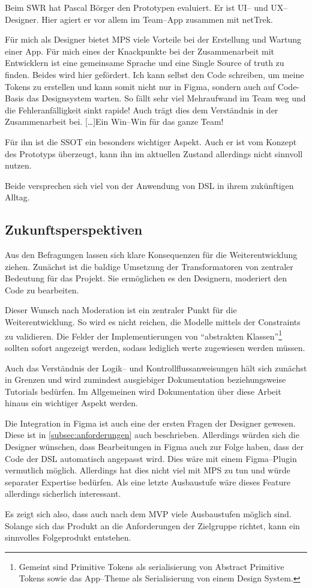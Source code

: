 Beim \ac{SWR} hat Pascal Börger den Prototypen evaluiert.
Er ist \acs{UI}-- und \acs{UX}--Designer.
Hier agiert er vor allem im Team--App zusammen mit \ac{netTrek}.
\begin{displayquote}
    Für mich als Designer bietet MPS viele Vorteile bei der Erstellung und Wartung einer App.
    Für mich eines der Knackpunkte bei der Zusammenarbeit mit Entwicklern ist eine gemeinsame Sprache und eine Single Source of truth zu finden.
    Beides wird hier gefördert.
    Ich kann selbst den Code schreiben, um meine Tokens zu erstellen und kann somit nicht nur in Figma, sondern auch auf Code-Basis das Designsystem warten.
    So fällt sehr viel Mehraufwand im Team weg und die Fehleranfälligkeit sinkt rapide!
    Auch trägt dies dem Verständnis in der Zusammenarbeit bei.
    [\ldots]\@ Ein Win--Win für das ganze Team!
\end{displayquote}
Für ihn ist die \ac{SSOT} ein besonders wichtiger Aspekt.
Auch er ist vom Konzept des Prototyps überzeugt, kann ihn im aktuellen Zustand allerdings nicht sinnvoll nutzen.

Beide versprechen sich viel von der Anwendung von \ac{DSL} in ihrem zukünftigen Alltag.

\subsection{Zukunftsperspektiven}\label{subsec:zukunftsperspektive}
Aus den Befragungen lassen sich klare Konsequenzen für die Weiterentwicklung ziehen.
Zunächst ist die baldige Umsetzung der Transformatoren von zentraler Bedeutung für das Projekt.
Sie ermöglichen es den Designern, moderiert den Code zu bearbeiten.

Dieser Wunsch nach Moderation ist ein zentraler Punkt für die Weiterentwicklung.
So wird es nicht reichen, die Modelle mittels der Constraints zu validieren.
Die Felder der Implementierungen von \enquote{abstrakten Klassen}\footnote{Gemeint sind Primitive Tokens als serialisierung von Abstract Primitive Tokens sowie das App--Theme als Serialisierung von einem Design System.} sollten sofort angezeigt werden, sodass lediglich werte zugewiesen werden müssen.

Auch das Verständnis der Logik-- und Kontrollflussanweisungen hält sich zunächst in Grenzen und wird zumindest ausgiebiger Dokumentation beziehungsweise Tutorials bedürfen.
Im Allgemeinen wird Dokumentation über diese Arbeit hinaus ein wichtiger Aspekt werden.

Die Integration in Figma ist auch eine der ersten Fragen der Designer gewesen.
Diese ist in \autoref{subsec:anforderungen} auch beschrieben.
Allerdings würden sich die Designer wünschen, dass Bearbeitungen in Figma auch zur Folge haben, dass der Code der \ac{DSL} automatisch angepasst wird.
Dies wäre mit einem Figma--Plugin vermutlich möglich.
Allerdings hat dies nicht viel mit \ac{MPS} zu tun und würde separater Expertise bedürfen.
Als eine letzte Ausbaustufe wäre dieses Feature allerdings sicherlich interessant.

Es zeigt sich also, dass auch nach dem \ac{MVP} viele Ausbaustufen möglich sind.
Solange sich das Produkt an die Anforderungen der Zielgruppe richtet, kann ein sinnvolles Folgeprodukt entstehen.